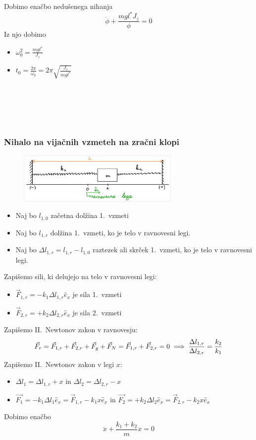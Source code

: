 Dobimo enačbo nedušenega nihanja
\[
\boxed{\ddot{\phi} + \frac{mgl^*{J_z}}\phi = 0}
\]
Iz njo dobimo
\begin{itemize}
    \item \(\omega_0^2 = \frac{mgl^*}{J_z}\)
    \item \(t_0 = \frac{2 \pi}{\omega_0} = 2 \pi \sqrt{\frac{J_z}{mgl^*}}\)
\end{itemize}
\ 
\\ 
\\ 
\\
\\
\newpage
\subsubsection*{Nihalo na vijačnih vzmeteh na zračni klopi}
\begin{figure}[h!]
    \centering
    \includegraphics[width=0.7\textwidth]{img/01_006.jpg}  
\end{figure}

\begin{itemize}
    \item Naj bo \(l_{1, 0}\) začetna dolžina 1.\ vzmeti
    \item Naj bo \(l_{1, r}\) dolžina 1.\ vzmeti, ko je telo v ravnovesni legi.    
    \item Naj bo \(\Delta l_{1, r} = l_{1, r} - l_{1, 0}\) raztezek ali skrček 1.\ vzmeti, ko je telo v ravnovesni legi.
\end{itemize}
Zapišemo sili, ki delujejo na telo v ravnovesni legi:
\begin{itemize}
    \item \(\vec{F}_{1, r} = -k_1 \Delta l_{1, r} \hat{e}_x\) je sila 1.\ vzmeti 
    \item \(\vec{F}_{2, r} = +k_2 \Delta l_{2, r} \hat{e}_x\) je sila 2.\ vzmeti 
\end{itemize}
Zapišemo II.\ Newtonov zakon v ravnovesju:
\[
\vec{F}_r = \vec{F}_{1, r} + \vec{F}_{2, r} + \vec{F}_g + \vec{F}_N = \vec{F}_{1, r} + \vec{F}_{2, r} = 0 \implies \frac{\Delta l_{1, r}}{\Delta l_{2, r}} = \frac{k_2}{k_1}
\]
Zapišemo II.\ Newtonov zakon v legi \(x\):
\begin{itemize}
    \item \(\Delta l_1 = \Delta l_{1, r} + x\) in \(\Delta l_2 = \Delta l_{2, r} - x\) 
    \item \(\vec{F_1} = -k_1 \Delta l_1 \hat{e}_x = \vec{F}_{1, r} - k_1x\hat{e}_x\) in \(\vec{F_2} = +k_2 \Delta l_2 \hat{e}_x = \vec{F}_{2, r} - k_2x\hat{e}_x\)
\end{itemize}
Dobimo enačbo 
\[
\boxed{\ddot{x} + \frac{k_1 + k_2}{m} x = 0}
\]

